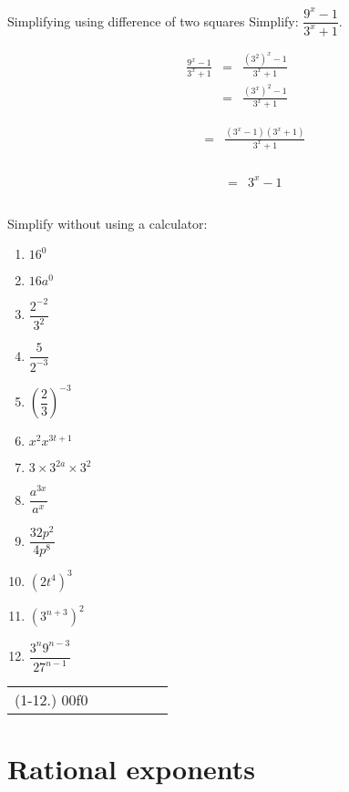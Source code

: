 \begin{wex}
{Simplifying using difference of two squares}
{Simplify: $\dfrac{9^x-1}{3^x+1}$.}
{
\begin{eqnarray*}
 \frac{9^x-1}{3^x+1} & = & \frac{(3^2)^x -1}{3^x+1} \\
		     & = & \frac{(3^x)^2-1}{3^x+1} 
\end{eqnarray*}

\begin{eqnarray*}
 \phantom{\frac{9^x-1}{3^x+1}} & = & \frac{(3^x-1)(3^x+1)}{3^x+1}\\
\end{eqnarray*}

\begin{eqnarray*}
 \phantom{\frac{9^x-1}{3^x+1}} & = & 3^x-1\\
\end{eqnarray*}
}
\end{wex}


\begin{exercises}{}{Simplify without using a calculator:
\begin{multicols}{2}
\begin{enumerate}[label=\textbf{\arabic*}., itemsep=5pt]
 \item $16^0$
 \item $16a^0$
 \item $\dfrac{2^{-2}}{3^2}$
 \item $ \dfrac{5}{2^{-3}}$
 \item $ \left(\dfrac{2}{3}\right)^{-3} $
 \item $ x^2 x^{3t+1} $
 \item $ 3 \times 3^{2a} \times 3^2$
 \item $ \dfrac{a^{3x}}{a^x} $
 \item $ \dfrac{32p^2}{4p^8}$
 \item $ (2t^4)^3$
 \item $ (3^{n+3})^2$
 \item $ \dfrac{3^n 9^{n-3}}{27^{n-1}}$
\end{enumerate}
\end{multicols}
\practiceinfo
\par
\begin{tabular}[h]{cccccc}
(1-12.) 00f0\end{tabular}
}
\end{exercises}

\section{Rational exponents}

